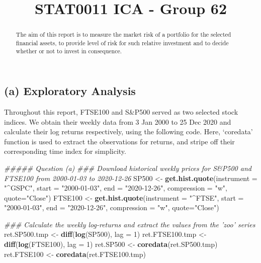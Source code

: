 \documentclass[]{article}
\title{STAT0011 ICA - Group 62}
\author{}
\date{\vspace{-2.5em}}
\newenvironment{Shaded}{\begin{snugshade}}{\end{snugshade}}
\newcommand{\CommentTok}[1]{\textcolor[rgb]{0.56,0.35,0.01}{\textit{#1}}}
\newcommand{\DataTypeTok}[1]{\textcolor[rgb]{0.13,0.29,0.53}{#1}}
\newcommand{\DecValTok}[1]{\textcolor[rgb]{0.00,0.00,0.81}{#1}}
\newcommand{\KeywordTok}[1]{\textcolor[rgb]{0.13,0.29,0.53}{\textbf{#1}}}
\newcommand{\NormalTok}[1]{#1}
\newcommand{\StringTok}[1]{\textcolor[rgb]{0.31,0.60,0.02}{#1}}
\begin{document}
\maketitle
\begin{abstract}
The aim of this report is to measure the market risk of a portfolio for
the selected financial assets, to provide level of risk for such
relative investment and to decide whether or not to invest in
consequence.
\end{abstract}

\hypertarget{a-exploratory-analysis}{%
\subsection{(a) Exploratory Analysis}\label{a-exploratory-analysis}}

Throughout this report, FTSE100 and S\&P500 served as two selected stock
indices. We obtain their weekly data from 3 Jan 2000 to 25 Dec 2020 and
calculate their log returns respectively, using the following code.
Here, `coredata' function is used to extract the observations for
returns, and stripe off their corresponding time index for simplicity.

\begin{Shaded}
\begin{Highlighting}[]
\CommentTok{##### Question (a)}
\CommentTok{### Download historical weekly prices for S&P500 and FTSE100 from 2000-01-03 to 2020-12-26}
\NormalTok{SP500 <-}\StringTok{ }\KeywordTok{get.hist.quote}\NormalTok{(}\DataTypeTok{instrument =} \StringTok{"^GSPC"}\NormalTok{, }\DataTypeTok{start =} \StringTok{"2000-01-03"}\NormalTok{,}
                         \DataTypeTok{end =} \StringTok{"2020-12-26"}\NormalTok{, }\DataTypeTok{compression =} \StringTok{"w"}\NormalTok{, }\DataTypeTok{quote=}\StringTok{"Close"}\NormalTok{)}
\NormalTok{FTSE100 <-}\StringTok{ }\KeywordTok{get.hist.quote}\NormalTok{(}\DataTypeTok{instrument =} \StringTok{"^FTSE"}\NormalTok{, }\DataTypeTok{start =} \StringTok{"2000-01-03"}\NormalTok{,}
                          \DataTypeTok{end =} \StringTok{"2020-12-26"}\NormalTok{, }\DataTypeTok{compression =} \StringTok{"w"}\NormalTok{, }\DataTypeTok{quote=}\StringTok{"Close"}\NormalTok{)}

\CommentTok{### Calculate the weekly log-returns and extract the values from the 'zoo' series}
\NormalTok{ret.SP500.tmp <-}\StringTok{ }\KeywordTok{diff}\NormalTok{(}\KeywordTok{log}\NormalTok{(SP500), }\DataTypeTok{lag =} \DecValTok{1}\NormalTok{)}
\NormalTok{ret.FTSE100.tmp <-}\StringTok{ }\KeywordTok{diff}\NormalTok{(}\KeywordTok{log}\NormalTok{(FTSE100), }\DataTypeTok{lag =} \DecValTok{1}\NormalTok{)}
\NormalTok{ret.SP500 <-}\StringTok{ }\KeywordTok{coredata}\NormalTok{(ret.SP500.tmp)}
\NormalTok{ret.FTSE100 <-}\StringTok{ }\KeywordTok{coredata}\NormalTok{(ret.FTSE100.tmp)}
\end{Highlighting}
\end{Shaded}
\end{document}
